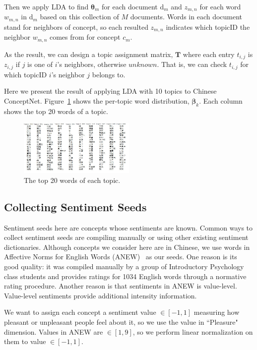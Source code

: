 Then we apply LDA to find $\boldsymbol{\theta}_m$ for each document d$_m$ and $z_{m,n}$ for each word $w_{m,n}$ in d$_m$ based on this collection of $M$ documents. Words in each document stand for neighbors of concept, so each resulted $z_{m,n}$ indicates which topicID the neighbor $w_{m,n}$ comes from for concept $c_m$.

As the result, we can design a topic assignment matrix, $\boldsymbol{T}$ where each entry $t_{i,j}$ is $z_{i,j}$ if $j$ is one of $i$'s neighbors, otherwise $unknown$. That is, we can check $t_{i,j}$ for which topicID $i$'s neighbor $j$ belongs to. 

Here we present the result of applying LDA with 10 topics to Chinese ConceptNet. Figure~\ref{fig:wordTop20} shows the per-topic word distribution, $\boldsymbol{\beta}_k$. Each column shows the top 20 words of a topic.

\begin{figure}[!t]
\centering
\includegraphics[width=0.5\textwidth]{fig/wordTop20.jpg}
\caption{The top 20 words of each topic.}
\label{fig:wordTop20}
\end{figure}

\subsection{Collecting Sentiment Seeds}
Sentiment seeds here are concepts whose sentiments are known. Common ways to collect sentiment seeds are compiling manually or using other existing sentiment dictionaries. Although concepts we consider here are in Chinese, we use words in Affective Norms for English Words (ANEW)~\cite{Bradley:ANEW99} as our seeds. One reason is its good quality: it was compiled manually by a group of Introductory Psychology class students and provides ratings for 1034 English words through a normative rating procedure. Another reason is that sentiments in ANEW is value-level. Value-level sentiments provide additional intensity information.

We want to assign each concept a sentiment value $\in [-1,1]$ measuring how pleasant or unpleasant people feel about it, so we use the value in ``Pleasure" dimension. Values in ANEW are $\in [1,9]$, so we perform linear normalization on them to value $\in [-1,1]$.

